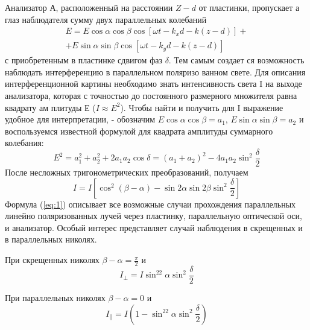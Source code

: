Анализатор А, расположенный на расстоянии $Z-d$ от
пластинки, пропускает а глаз наблюдателя сумму двух параллельных
колебаний 
\begin{gather}
	E=E\cos\alpha\cos\beta\cos\left[\omega t -k_xd-k(z-d) \right]+\\
	+E\sin\alpha\sin\beta\cos\left[\omega t -k_yd-k(z-d) \right]
\end{gather}
с приобретенным в пластинке сдвигом фаз $\delta$. Тем самым создает­
ся возможность наблюдать интерференцию в параллельном поляризо­
ванном свете. Для описания интерференционной картины необходимо
знать интенсивность света I на выходе анализатора, которая с
точностью до постоянного размерного множителя равна квадрату ам­
плитуды Е ($I\approx E^2$). Чтобы найти и получить для I выражение
удобное для интерпретации, - обозначим $E\cos\alpha\cos\beta=a_1$,
$E\sin\alpha\sin\beta=a_2$  и воспользуемся известной формулой
для квадрата амплитуды суммарного колебания:
\begin{equation}
	E^2=a_1^2+a_2^2+2a_1a_2\cos\delta=(a_1+a_2)^2-4a_1a_2\sin^2\frac{\delta}{2}
\end{equation}
После несложных тригонометрических преобразований, получаем
\begin{equation}
	\label{eq:1}
	I=I\left[\cos^2(\beta-\alpha)-\sin2\alpha\sin2\beta\sin^2\frac{\delta}{2} \right]
\end{equation}
Формула (\ref{eq:1}) описывает все возможные случаи прохождения параллельных линейно поляризованных лучей через пластинку, параллельную
оптической оси, и анализатор. Особый интерес представляет слу­чай наблюдения в скрещенных и в параллельных николях.

При скрещенных николях $\beta-\alpha=\frac{\pi}{2}$ и
\begin{equation}
	I_{\bot}=I\sin^22\alpha \sin^2\frac{\delta}{2}
\end{equation}

При параллельных николях $\beta-\alpha=0$ и 
\begin{equation}
	I_{\|}=I\left(1-\sin^22\alpha \sin^2\frac{\delta}{2}\right)
\end{equation}

